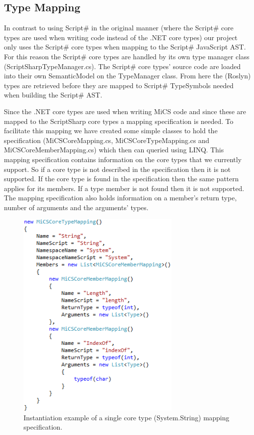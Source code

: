 	\subsection{Type Mapping} %
	\label{sub:type_mapping}
		In contrast to using Script\# in the original manner (where the Script\# core types are used when writing code instead of the .NET core types) our project only uses the Script\# core types when mapping to the Script\# JavaScript AST. For this reason the Script\# core types are handled by its own type manager class (ScriptSharpTypeManager.cs). The Script\# core types’ source code are loaded into their own SemanticModel on the TypeManager class. From here the (Roslyn) types are retrieved before they are mapped to Script\# TypeSymbols needed when building the Script\# AST.

		Since the .NET core types are used when writing MiCS code and since these are mapped to the ScriptSharp core types a mapping specification is needed. To facilitate this mapping we have created some simple classes to hold the specification (MiCSCoreMapping.cs, MiCSCoreTypeMapping.cs and MiCSCoreMemberMapping.cs) which then can queried using LINQ. This mapping specification contains information on the core types that we currently support. So if a core type is not described in the specification then it is not supported. If the core type is found in the specification then the same pattern applies for its members. If a type member is not found then it is not supported. The mapping specification also holds information on a member’s return type, number of arguments and the arguments’ types.

		\begin{figure}[H]
				\includegraphics[width=8cm]{resources/images/InitiationOfTypeMapping.png}
			\caption{Instantiation example of a single core type (System.String) mapping specification.}
			\label{coreTypeMapping}
		\end{figure}

